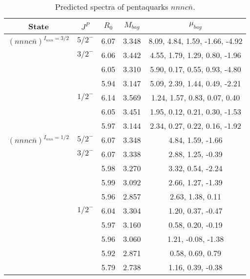 \documentclass[prd,twocolumn,floatfix,nofootinbib]{revtex4}
\begin{document}
\renewcommand{\tabcolsep}{0.5cm}
\renewcommand{\arraystretch}{1.2}
\begin{table*}[!htbp]
    \caption{Predicted spectra of pentaquarks $nnnc\bar{n}$.}
    \begin{tabular}{ccccc}
        \hline\hline
        {\rm State} &$J^{P}$ &$R_{0}$ &$M_{bag}$ &$\mu_{bag}$ \\ \hline
        ${(nnnc\bar{n})}^{I_{nnn}=3/2}$
            &${5/2}^{-}$    &6.07   &3.348  &8.09, 4.84, 1.59, -1.66, -4.92 \\
            &${3/2}^{-}$    &6.06   &3.442  &4.55, 1.79, 1.29, 0.80, -1.96 \\
            &               &6.05   &3.310  &5.90, 0.17, 0.55, 0.93, -4.80 \\
            &               &5.94   &3.147  &5.09, 2.39, 1.44, 0.49, -2.21 \\
            &${1/2}^{-}$    &6.14   &3.569  &1.24, 1.57, 0.83, 0.07, 0.40 \\
            &               &6.05   &3.451  &1.95, 0.12, 0.21, 0.30, -1.53 \\
            &               &5.97   &3.144  &2.34, 0.27, 0.22, 0.16, -1.92 \\
        ${(nnnc\bar{n})}^{I_{nnn}=1/2}$
            &${5/2}^{-}$    &6.07   &3.348  &4.84, 1.59, -1.66 \\
            &${3/2}^{-}$    &6.07   &3.338  &2.88, 1.25, -0.39 \\
            &               &5.98   &3.270  &3.32, 0.54, -2.24 \\
            &               &5.99   &3.092  &2.66, 1.27, -1.39 \\
            &               &5.96   &2.857  &2.63, 1.38, 0.11 \\
            &${1/2}^{-}$    &6.04   &3.304  &1.20, 0.37, -0.47 \\
            &               &5.97   &3.160  &0.58, 0.20, -0.19 \\
            &               &5.96   &3.060  &1.21, -0.08, -1.38 \\
            &               &5.92   &2.871  &0.58, 0.69, 0.79 \\
            &               &5.79   &2.738  &1.16, 0.39, -0.38 \\
        \hline\hline
    \end{tabular}
\end{table*}
\end{document}
